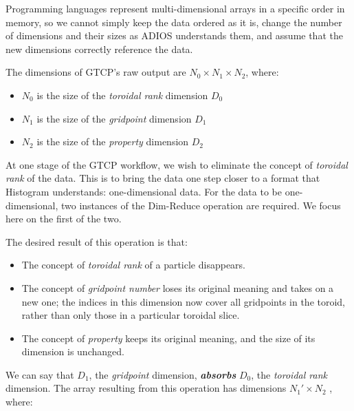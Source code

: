 Programming languages represent multi-dimensional
arrays in a specific order in
memory, so we cannot simply keep the data
ordered as it is, change the number
of dimensions and their sizes as ADIOS understands them, 
and assume that the new dimensions correctly
reference the data.

The dimensions of GTCP's raw output are 
$N_0{\times}N_1{\times}N_2$, where:

\begin{itemize}

\item $N_0$ is the size of the {\em toroidal rank} dimension $D_0$

\item $N_1$ is the size of the {\em gridpoint} dimension $D_1$

\item $N_2$ is the size of the {\em property} dimension $D_2$

\end{itemize}

At one stage of the GTCP workflow, we wish
to eliminate the concept of
{\em toroidal rank} of the data. This is to bring the data one step
closer to a format that Histogram understands:
one-dimensional data.
For the data to be one-dimensional, two instances of the
Dim-Reduce operation are required.
We focus here on the first of the two.

The desired result of this operation is that:

\begin{itemize}

\item The concept of {\em toroidal rank} of a particle disappears.

\item The concept of {\em gridpoint number} loses its
  original meaning and takes
  on a new one; the indices in this dimension now
  cover all gridpoints in the toroid,
  rather than only those in a particular toroidal slice.
  
\item The concept of {\em property} keeps its original
  meaning, and the size of its dimension is unchanged.

\end{itemize}

We can say that $D_1$, the {\em gridpoint} dimension,
\textbf{\em absorbs} $D_0$, the {\em toroidal rank} dimension.
The array resulting from this
operation has dimensions $N_1'{\times}N_2$ , where:


